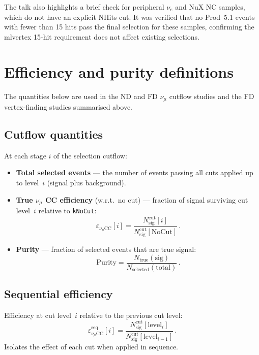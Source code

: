 \documentclass{article}
\begin{document}
The talk also highlights a brief check for peripheral $\nu_e$ and NuX NC samples, which do not have an explicit NHits cut.
It was verified that no Prod~5.1 events with fewer than 15 hits pass the final selection for these samples, confirming the mlvertex 15-hit requirement does not affect existing selections.

\appendix
\section{Efficiency and purity definitions}
\label{app:eff-defs}

The quantities below are used in the ND and FD $\nu_{\mu}$ cutflow studies and the FD vertex-finding studies summarised above.

\subsection{Cutflow quantities}
\label{app:cutflow}

At each stage $i$ of the selection cutflow:
\begin{itemize}
    \item \textbf{Total selected events} --- the number of events passing all cuts applied up to level~$i$ (signal plus background).
    \item \textbf{True $\nu_{\mu}$ CC efficiency} (w.r.t.\ no cut) --- fraction of signal surviving cut level~$i$ relative to \texttt{kNoCut}:
    \begin{equation}
        \varepsilon_{\nu_{\mu}\mathrm{CC}}[i] = \frac{N_\mathrm{sig}^\mathrm{cut}[i]}{N_\mathrm{sig}^\mathrm{cut}[\mathrm{NoCut}]}\,.
        \label{eq:cutflow-eff-nocut}
    \end{equation}
    \item \textbf{Purity} --- fraction of selected events that are true signal:
    \begin{equation}
        \mathrm{Purity} = \frac{N_\mathrm{true}(\mathrm{sig})}{N_\mathrm{selected}(\mathrm{total})}\,.
        \label{eq:purity}
    \end{equation}
\end{itemize}

\subsection{Sequential efficiency}
\label{app:sequential}

Efficiency at cut level~$i$ relative to the previous cut level:
\begin{equation}
    \varepsilon_{\nu_{\mu}\mathrm{CC}}^\mathrm{seq}[i] = \frac{N_\mathrm{sig}^\mathrm{cut}[\mathrm{level}_i]}{N_\mathrm{sig}^\mathrm{cut}[\mathrm{level}_{i-1}]}\,.
    \label{eq:sequential-eff}
\end{equation}
\noindent Isolates the effect of each cut when applied in sequence.
\end{document}
